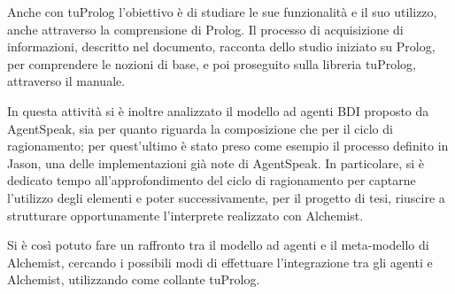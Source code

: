 Anche con tuProlog l'obiettivo è di studiare le sue funzionalità e il suo utilizzo, anche attraverso la comprensione di Prolog. Il processo di acquisizione di informazioni, descritto nel documento, racconta dello studio iniziato su Prolog, per comprendere le nozioni di base, e poi proseguito sulla libreria tuProlog, attraverso il manuale.

In questa attività si è inoltre analizzato il modello ad agenti BDI proposto da AgentSpeak, sia per quanto riguarda la composizione che per il ciclo di ragionamento; per quest'ultimo è stato preso come esempio il processo definito in Jason, una delle implementazioni già note di AgentSpeak. In particolare, si è dedicato tempo all'approfondimento del ciclo di ragionamento per captarne l'utilizzo degli elementi e poter successivamente, per il progetto di tesi, riuscire a strutturare opportunamente l'interprete realizzato con Alchemist.

Si è così potuto fare un raffronto tra il modello ad agenti e il meta-modello di Alchemist, cercando i possibili modi di effettuare l'integrazione tra gli agenti e Alchemist, utilizzando come collante tuProlog.
